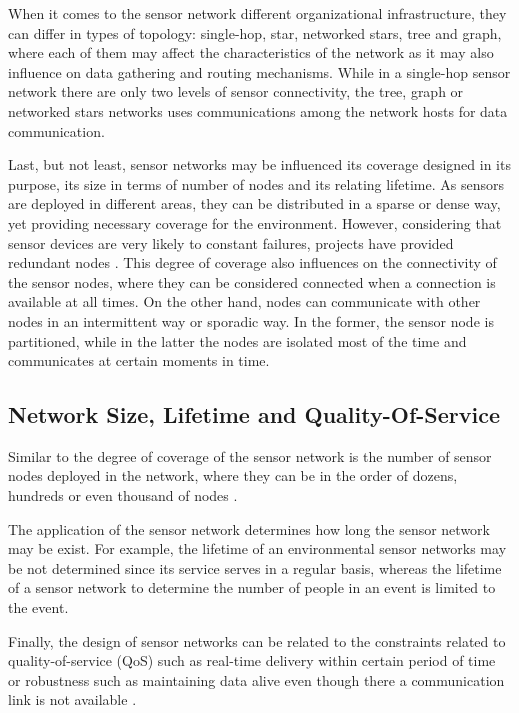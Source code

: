 When it comes to the sensor network different organizational infrastructure,
they can differ in types of topology: single-hop, star, networked stars, tree
and graph, where each of them may affect the characteristics of the network as it 
may also influence on data gathering and routing mechanisms. While in a
single-hop sensor network there are only two levels of sensor connectivity, the
tree, graph or networked stars networks uses communications among the network
hosts for data communication.

Last, but not least, sensor networks may be influenced its coverage designed in
its purpose, its size in terms of number of nodes and its relating lifetime. As
sensors are deployed in different areas, they can be distributed in a sparse or
dense way, yet providing necessary coverage for the environment. However, 
considering that sensor devices are very likely to constant failures, projects 
have provided redundant nodes \cite{sn-intro01}. This degree of coverage also 
influences on the connectivity of the sensor nodes, where they can be
considered connected when a connection is available at all times. On the other
hand, nodes can communicate with other nodes in an intermittent way or sporadic
way. In the former, the sensor node is partitioned, while in the latter the
nodes are isolated most of the time and communicates at certain moments in
time.

\subsection{Network Size, Lifetime and Quality-Of-Service}

Similar to the degree of coverage of the sensor network is the number of
sensor nodes deployed in the network, where they can be in the order of
dozens, hundreds or even thousand of nodes \cite{sn-intro01}.

The application of the sensor network determines how long the sensor
network may be exist. For example, the lifetime of an environmental sensor
networks \cite{sn-ex01} may be not determined since its service serves in a
regular basis, whereas the lifetime of a sensor network to determine the number
of people in an event is limited to the event. 

Finally, the design of sensor networks can be related to the constraints
related to quality-of-service (QoS) such as real-time delivery within certain
period of time or robustness such as maintaining data alive even though there
a communication link is not available \cite{sn-intro02}.

